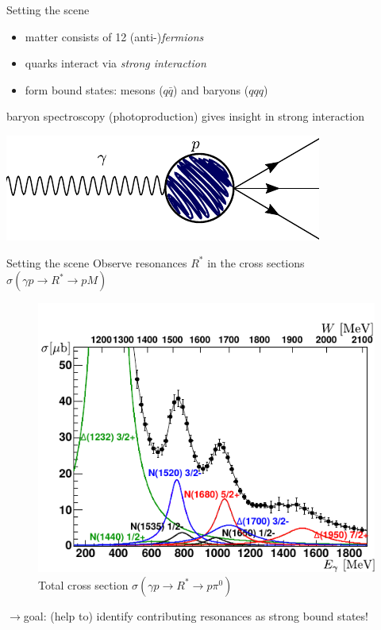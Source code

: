 \documentclass[11pt,aspectratio=169,dvipsnames]{beamer}
\newcommand{\thecolor}{black!70!blue}
\begin{document}
	\begin{frame}{Setting the scene}
			\addtocounter{page}{-1}
		\begin{tcolorbox}[colback=blue!5,colframe=\thecolor,title=The Standard Model of Particle Physics]
			\begin{itemize}
				\item matter consists of 12 (anti-)\emph{fermions}
				\item quarks interact via \emph{strong interaction} 
				\item form bound states: mesons ($q\bar{q}$) and baryons ($qqq$)
			\end{itemize} 
		\end{tcolorbox}
	baryon spectroscopy (photoproduction) gives insight in strong interaction
	\begin{center}
			\includegraphics[width=.6\linewidth]{feynman}
	\end{center}


	
	
\end{frame}
\begin{frame}{Setting the scene}
	Observe resonances $R^*$ in the cross sections $\sigma(\gamma p \to R^* \to p M)$
	\vspace{-0.8cm}
	\begin{figure}
		\centering
		\includegraphics[width=.5\linewidth]{partialwaves}
		\caption*{Total cross section $\sigma(\gamma p \to R^*\to p \pi^0)$ }
	\end{figure}
$\to$goal: (help to) identify contributing resonances as strong bound states!\\
\end{frame}
\begin{frame}
	\tableofcontents
\end{frame}
\end{document}
